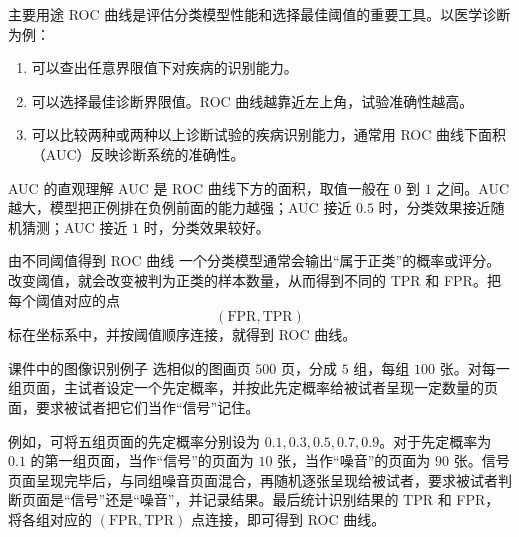 \documentclass[UTF8,zihao=-4,fontset=fandol]{ctexart}
\begin{document}
\begin{methodbox}{主要用途}
ROC 曲线是评估分类模型性能和选择最佳阈值的重要工具。以医学诊断为例：
\begin{enumerate}
  \item 可以查出任意界限值下对疾病的识别能力。
  \item 可以选择最佳诊断界限值。ROC 曲线越靠近左上角，试验准确性越高。
  \item 可以比较两种或两种以上诊断试验的疾病识别能力，通常用 ROC 曲线下面积（AUC）反映诊断系统的准确性。
\end{enumerate}
\end{methodbox}

\begin{keybox}{AUC 的直观理解}
AUC 是 ROC 曲线下方的面积，取值一般在 $0$ 到 $1$ 之间。AUC 越大，模型把正例排在负例前面的能力越强；AUC 接近 $0.5$ 时，分类效果接近随机猜测；AUC 接近 $1$ 时，分类效果较好。
\end{keybox}

\begin{methodbox}{由不同阈值得到 ROC 曲线}
一个分类模型通常会输出“属于正类”的概率或评分。改变阈值，就会改变被判为正类的样本数量，从而得到不同的 TPR 和 FPR。把每个阈值对应的点
\[
(\mathrm{FPR},\mathrm{TPR})
\]
标在坐标系中，并按阈值顺序连接，就得到 ROC 曲线。
\end{methodbox}

\begin{methodbox}{课件中的图像识别例子}
选相似的图画页 $500$ 页，分成 $5$ 组，每组 $100$ 张。对每一组页面，主试者设定一个先定概率，并按此先定概率给被试者呈现一定数量的页面，要求被试者把它们当作“信号”记住。

例如，可将五组页面的先定概率分别设为 $0.1,0.3,0.5,0.7,0.9$。对于先定概率为 $0.1$ 的第一组页面，当作“信号”的页面为 $10$ 张，当作“噪音”的页面为 $90$ 张。信号页面呈现完毕后，与同组噪音页面混合，再随机逐张呈现给被试者，要求被试者判断页面是“信号”还是“噪音”，并记录结果。最后统计识别结果的 TPR 和 FPR，将各组对应的 $(\mathrm{FPR},\mathrm{TPR})$ 点连接，即可得到 ROC 曲线。
\end{methodbox}
\end{document}

